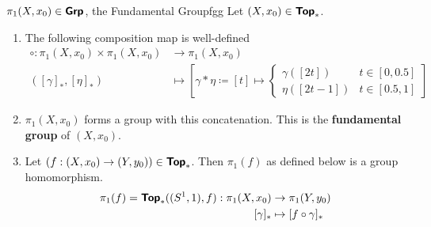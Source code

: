 \begin{theorem}{$\pi_1(X,x_0)\in\bm{\mathsf{Grp}}$, the Fundamental Group}{fgg}
  Let $(X,x_0)\in\bm{\mathsf{Top}}_*$. \begin{enumerate}
    \item The following composition map is well-defined \begin{align*}
      \circ : \pi_1(X,x_0)\times\pi_1(X,x_0)&\to \pi_1(X,x_0)\\
      ([\gamma]_*,[\eta]_*) &\mapsto \left[
        \gamma\ast\eta \coloneq [t]\mapsto \begin{cases}
          \gamma([2t]) & t\in[0,0.5]\\
          \eta([2t-1]) & t\in[0.5,1]
        \end{cases}
      \right]
    \end{align*}
    \item $\pi_1(X,x_0)$ forms a group with this concatenation. This is the \textbf{fundamental group} of $(X,x_0)$.
    \item Let $(f:(X,x_0)\to(Y,y_0))\in\bm{\mathsf{Top}}_*$. Then $\pi_1(f)$ as defined below is a group homomorphism. \begin{align*}
           \pi_1(f)=\bm{\mathsf{Top}}_*((S^1,1),f):\pi_1(X,x_0)&\to \pi_1(Y,y_0) \\
           [\gamma]_*&\mapsto[f\circ\gamma]_*
    \end{align*}
  \end{enumerate}
\end{theorem}

